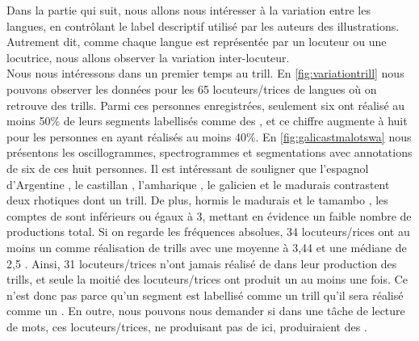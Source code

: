 Dans la partie qui suit, nous allons nous intéresser à la variation entre les langues, en contrôlant le label descriptif utilisé par les auteurs des illustrations. Autrement dit, comme chaque langue est représentée par un locuteur ou une locutrice, nous allons observer la variation inter-locuteur.\\


Nous nous intéressons dans un premier temps au trill. En \autoref{fig:variationtrill} nous pouvons observer les données pour les 65 locuteurs/trices de langues où on retrouve des trills.
Parmi ces personnes enregistrées, seulement six ont réalisé au moins 50\% de leurs segments labellisés  comme des , et ce chiffre augmente à huit pour les personnes en ayant réalisés au moins 40\%.
En \autoref{fig:galicastmalotswa} nous présentons les oscillogrammes, spectrogrammes et segmentations avec annotations de six de ces huit personnes. Il est intéressant de souligner que l'espagnol d'Argentine , le castillan , l'amharique , le galicien  et le madurais  contrastent deux rhotiques dont un trill.
De plus, hormis le madurais  et le tamambo , les comptes de  sont inférieurs ou égaux à 3, mettant en évidence un faible nombre de productions total.
Si on regarde les fréquences absolues, 34 locuteurs/rices ont au moins un  comme réalisation de trills avec une moyenne à 3,44 et une médiane de 2,5 .
Ainsi, 31 locuteurs/trices n'ont jamais réalisé de  dans leur production des trills, et seule la moitié des locuteurs/trices ont produit un  au moins une fois. Ce n'est donc pas parce qu'un segment est labellisé comme un trill qu'il sera réalisé comme un . En outre, nous pouvons nous demander si dans une tâche de lecture de mots, ces locuteurs/trices, ne produisant pas de  ici, produiraient des .\\


